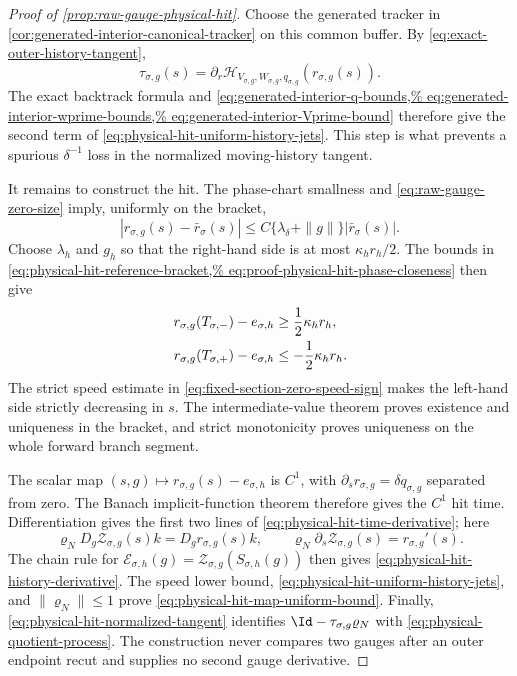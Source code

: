 \begin{proof}[Proof of
\cref{prop:raw-gauge-physical-hit}]
Choose the generated tracker in
\cref{cor:generated-interior-canonical-tracker} on this common buffer.
By \cref{eq:exact-outer-history-tangent},
\begin{equation*}
 \tau_{\sigma,g}(s)
 =\partial_r\mathcal H_{V_{\sigma,g},W_{\sigma,g},q_{\sigma,g}}
       (r_{\sigma,g}(s)).
\end{equation*}
The exact backtrack formula and
\cref{eq:generated-interior-q-bounds,%
eq:generated-interior-wprime-bounds,%
eq:generated-interior-Vprime-bound}
therefore give the second term of
\cref{eq:physical-hit-uniform-history-jets}.  This step is what prevents a
spurious \(\delta^{-1}\) loss in the normalized moving-history tangent.

It remains to construct the hit.  The phase-chart smallness and
\cref{eq:raw-gauge-zero-size} imply, uniformly on the bracket,
\begin{equation}
 |r_{\sigma,g}(s)-\bar r_\sigma(s)|
 \le C\{\lambda_\delta+\|g\|\}
          |\bar r_\sigma(s)|.                    \label{eq:proof-physical-hit-phase-closeness}
\end{equation}
Choose \(\lambda_h\) and \(g_h\) so that the right-hand side is at most
\(\kappa_hr_h/2\).  The bounds in
\cref{eq:physical-hit-reference-bracket,%
eq:proof-physical-hit-phase-closeness}
then give
\begin{align}
 r_{\sigma,g}(T_{\sigma,-})-e_{\sigma,h}
 &\ge\frac12\kappa_hr_h,\notag\\
 r_{\sigma,g}(T_{\sigma,+})-e_{\sigma,h}
 &\le-\frac12\kappa_hr_h.                       \label{eq:proof-physical-hit-signs}
\end{align}
The strict speed estimate in
\cref{eq:fixed-section-zero-speed-sign} makes the left-hand side strictly
decreasing in \(s\).  The intermediate-value theorem proves existence and
uniqueness in the bracket, and strict monotonicity proves uniqueness on the
whole forward branch segment.

The scalar map
\((s,g)\mapsto r_{\sigma,g}(s)-e_{\sigma,h}\) is \(C^1\), with
\(\partial_sr_{\sigma,g}=\delta q_{\sigma,g}\) separated from zero.
The Banach implicit-function theorem therefore gives the \(C^1\) hit time.
Differentiation gives the first two lines of
\cref{eq:physical-hit-time-derivative}; here
\begin{equation*}
 \varrho_ND_g\mathcal Z_{\sigma,g}(s)k
 =D_gr_{\sigma,g}(s)k,\qquad
 \varrho_N\partial_s\mathcal Z_{\sigma,g}(s)
 =r_{\sigma,g}'(s).
\end{equation*}
The chain rule for
\(\mathcal E_{\sigma,h}(g)=
  \mathcal Z_{\sigma,g}(S_{\sigma,h}(g))\)
then gives
\cref{eq:physical-hit-history-derivative}.  The speed lower bound,
\cref{eq:physical-hit-uniform-history-jets}, and
\(\|\varrho_N\|\le1\) prove
\cref{eq:physical-hit-map-uniform-bound}.  Finally,
\cref{eq:physical-hit-normalized-tangent} identifies
\(\Id-\tau_{\sigma,g}\varrho_N\) with
\cref{eq:physical-quotient-process}.  The construction never compares two
gauges after an outer endpoint recut and supplies no second gauge
derivative.
\end{proof}

